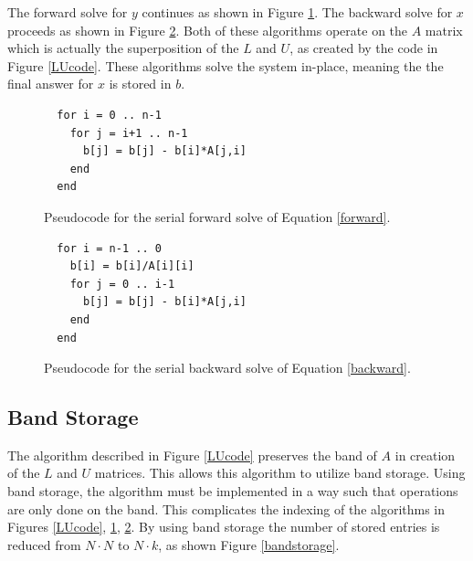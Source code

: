 \documentclass[12pt]{article}
\begin{document}
The forward solve for $y$ continues as shown in Figure \ref{forwardcode}. The
backward solve for $x$ proceeds as shown in Figure \ref{backwardcode}.
Both of these algorithms operate on the $A$ matrix which is
actually the superposition of the $L$ and $U$, as created by the code in Figure \ref{LUcode}.
These algorithms solve the system in-place, meaning the the final answer for $x$ is stored in $b$.

\begin{figure}[H]
\caption{Pseudocode for the serial forward solve of Equation \ref{forward}.}
\label{forwardcode}
\begin{lstlisting}
  for i = 0 .. n-1
    for j = i+1 .. n-1
      b[j] = b[j] - b[i]*A[j,i]
    end
  end
\end{lstlisting}
\end{figure}

\begin{figure}[H]
\caption{Pseudocode for the serial backward solve of Equation \ref{backward}.}
\label{backwardcode}
\begin{lstlisting}
  for i = n-1 .. 0
    b[i] = b[i]/A[i][i]
    for j = 0 .. i-1
      b[j] = b[j] - b[i]*A[j,i]
    end
  end
\end{lstlisting}
\end{figure}

\subsection{Band Storage}
\label{band}

The algorithm described in Figure \ref{LUcode} preserves the band of $A$ in
creation of the $L$ and $U$ matrices. This allows this algorithm to utilize
band storage. Using band storage, the algorithm must be implemented in a way
such that operations are only done on the band. This complicates the indexing
of the algorithms in Figures \ref{LUcode}, \ref{forwardcode},
\ref{backwardcode}.  By using band storage the number of stored entries is
reduced from $N \cdot N$ to $N \cdot k$, as shown Figure \ref{bandstorage}.
\end{document}
